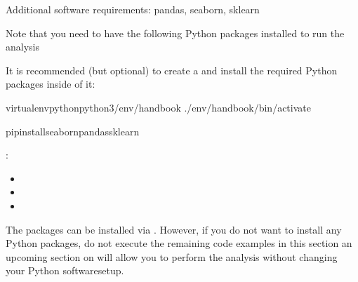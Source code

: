 \begin{importantnote}[before title={\thetcbcounter\ }, check odd page=true]{Additional software requirements: pandas, seaborn, sklearn}

\sphinxAtStartPar
Note that you need to have the following Python packages installed to run the
analysis%
\begin{footnote}\sphinxAtStartFootnote
It is recommended (but optional) to create a
 and
install the required Python packages inside of it:

\sphinxSetupCodeBlockInFootnote
\begin{sphinxVerbatim}[commandchars=\\\{\}]
virtualenv\PYGZhy{}\PYGZhy{}pythonpython3\PYGZti{}/env/handbook
.\PYGZti{}/env/handbook/bin/activate
\end{sphinxVerbatim}

\sphinxSetupCodeBlockInFootnote
\begin{sphinxVerbatim}[commandchars=\\\{\}]
pipinstallseabornpandassklearn
\end{sphinxVerbatim}
%
\end{footnote}:
\begin{itemize}
\item {} 
\sphinxAtStartPar
{}

\item {} 
\sphinxAtStartPar
{}

\item {} 
\sphinxAtStartPar
{}

\end{itemize}

\sphinxAtStartPar
The packages can be installed via {\hyperref[\detokenize{glossary:term-pip}]{}}.
However, if you do not want to install any
Python packages, do not execute the remaining code examples in this section
\textendash{} an upcoming section on  will allow you to
perform the analysis without changing your Python software\sphinxhyphen{}setup.


\end{importantnote}

